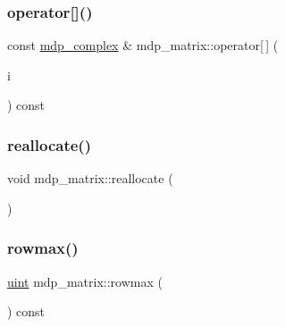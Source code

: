 \mbox{\label{classmdp__matrix_af06d6f34cd2f07e89e2d5a6a0c02d478}} 
\subsubsection{\texorpdfstring{operator[]()}{operator[]()}\hspace{0.1cm}{\footnotesize\ttfamily [2/2]}}
{\footnotesize\ttfamily const \hyperlink{classmdp__complex}{mdp\+\_\+complex} \& mdp\+\_\+matrix\+::operator\mbox{[}$\,$\mbox{]} (\begin{DoxyParamCaption}\item[{const \hyperlink{mdp__global__vars_8h_a91ad9478d81a7aaf2593e8d9c3d06a14}{uint}}]{i }\end{DoxyParamCaption}) const\hspace{0.3cm}{\ttfamily [inline]}}

\mbox{\label{classmdp__matrix_aae11eac9a3c0f2c0cc05450a67924cda}} 
\subsubsection{\texorpdfstring{reallocate()}{reallocate()}}
{\footnotesize\ttfamily void mdp\+\_\+matrix\+::reallocate (\begin{DoxyParamCaption}{ }\end{DoxyParamCaption})\hspace{0.3cm}{\ttfamily [inline]}}

\mbox{\label{classmdp__matrix_a224a84e082fe093083f1887ed9bc185e}} 
\subsubsection{\texorpdfstring{rowmax()}{rowmax()}}
{\footnotesize\ttfamily \hyperlink{mdp__global__vars_8h_a91ad9478d81a7aaf2593e8d9c3d06a14}{uint} mdp\+\_\+matrix\+::rowmax (\begin{DoxyParamCaption}{ }\end{DoxyParamCaption}) const\hspace{0.3cm}{\ttfamily [inline]}}


